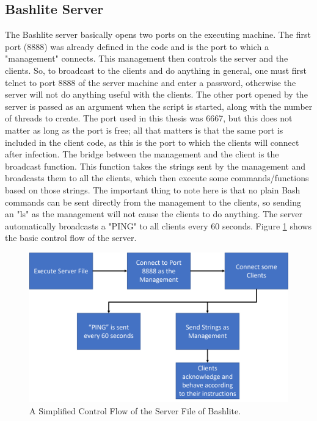 \subsection{Bashlite Server}
The Bashlite server basically opens two ports on the executing machine. The first port (8888) was already defined in the code and is the port to which a "management" connects. This management then controls the server and the clients. So, to broadcast to the clients and do anything in general, one must first telnet to port 8888 of the server machine and enter a password, otherwise the server will not do anything useful with the clients. The other port opened by the server is passed as an argument when the script is started, along with the number of threads to create. The port used in this thesis was 6667, but this does not matter as long as the port is free; all that matters is that the same port is included in the client code, as this is the port to which the clients will connect after infection. The bridge between the management and the client is the broadcast function. This function takes the strings sent by the management and broadcasts them to all the clients, which then execute some commands/functions based on those strings. The important thing to note here is that no plain Bash commands can be sent directly from the management to the clients, so sending an "ls" as the management will not cause the clients to do anything. The server automatically broadcasts a "PING" to all clients every 60 seconds. Figure \ref{graphic:controlStreamServer} shows the basic control flow of the server. 

\begin{figure}[tph]
\includegraphics[scale=0.6]{assets/controlStream.png}
\centering
\caption{A Simplified Control Flow of the Server File of Bashlite.}
    \label{graphic:controlStreamServer}
\end{figure}

